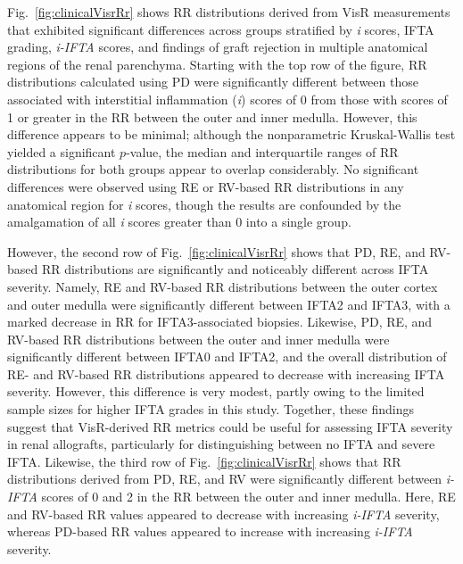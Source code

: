 % 
Fig.~\ref{fig:clinicalVisrRr} shows RR distributions derived from VisR measurements that exhibited significant differences across groups stratified by \emph{i} scores, IFTA grading, \emph{i-IFTA} scores, and findings of graft rejection in multiple anatomical regions of the renal parenchyma. Starting with the top row of the figure, RR distributions calculated using PD were significantly different between those associated with interstitial inflammation (\emph{i}) scores of 0 from those with scores of 1 or greater in the RR between the outer and inner medulla. However, this difference appears to be minimal; although the nonparametric Kruskal-Wallis test yielded a significant $p$-value, the median and interquartile ranges of RR distributions for both groups appear to overlap considerably. No significant differences were observed using RE or RV-based RR distributions in any anatomical region for \emph{i} scores, though the results are confounded by the amalgamation of all \emph{i} scores greater than 0 into a single group.

%
However, the second row of Fig.~\ref{fig:clinicalVisrRr} shows that PD, RE, and RV-based RR distributions are significantly and noticeably different across IFTA severity. Namely, RE and RV-based RR distributions between the outer cortex and outer medulla were significantly different between IFTA2 and IFTA3, with a marked decrease in RR for IFTA3-associated biopsies. Likewise, PD, RE, and RV-based RR distributions between the outer and inner medulla were significantly different between IFTA0 and IFTA2, and the overall distribution of RE- and RV-based RR distributions appeared to decrease with increasing IFTA severity. However, this difference is very modest, partly owing to the limited sample sizes for higher IFTA grades in this study. Together, these findings suggest that VisR-derived RR metrics could be useful for assessing IFTA severity in renal allografts, particularly for distinguishing between no IFTA and severe IFTA. Likewise, the third row of Fig.~\ref{fig:clinicalVisrRr} shows that RR distributions derived from PD, RE, and RV were significantly different between \emph{i-IFTA} scores of 0 and 2 in the RR between the outer and inner medulla. Here, RE and RV-based RR values appeared to decrease with increasing \emph{i-IFTA} severity, whereas PD-based RR values appeared to increase with increasing \emph{i-IFTA} severity.

